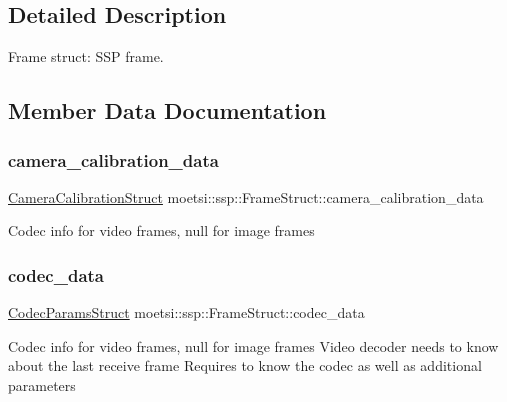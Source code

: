 \subsection{Detailed Description}
Frame struct\+: S\+SP frame. 

\subsection{Member Data Documentation}
\mbox{\label{structmoetsi_1_1ssp_1_1FrameStruct_acbdc93c52c66264ed3f4c06a088c955d}} 
\subsubsection{\texorpdfstring{camera\+\_\+calibration\+\_\+data}{camera\_calibration\_data}}
{\footnotesize\ttfamily \hyperlink{structmoetsi_1_1ssp_1_1CameraCalibrationStruct}{Camera\+Calibration\+Struct} moetsi\+::ssp\+::\+Frame\+Struct\+::camera\+\_\+calibration\+\_\+data}

Codec info for video frames, null for image frames \mbox{\label{structmoetsi_1_1ssp_1_1FrameStruct_a84ed01cb3227bcece29c43ba8ec322ee}} 
\subsubsection{\texorpdfstring{codec\+\_\+data}{codec\_data}}
{\footnotesize\ttfamily \hyperlink{structmoetsi_1_1ssp_1_1CodecParamsStruct}{Codec\+Params\+Struct} moetsi\+::ssp\+::\+Frame\+Struct\+::codec\+\_\+data}

Codec info for video frames, null for image frames Video decoder needs to know about the last receive frame Requires to know the codec as well as additional parameters \mbox{\label{structmoetsi_1_1ssp_1_1FrameStruct_af3b1ea702009be5df748af30a159a38a}} 

